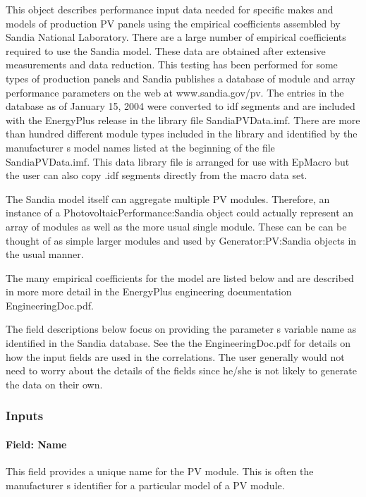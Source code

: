 This object describes performance input data needed for specific makes and models of production PV panels using the empirical coefficients assembled by Sandia National Laboratory. There are a large number of empirical coefficients required to use the Sandia model. These data are obtained after extensive measurements and data reduction. This testing has been performed for some types of production panels and Sandia publishes a database of module and array performance parameters on the web at www.sandia.gov/pv. The entries in the database as of January 15, 2004 were converted to idf segments and are included with the EnergyPlus release in the library file SandiaPVData.imf. There are more than hundred different module types included in the library and identified by the manufacturer s model names listed at the beginning of the file SandiaPVData.imf. This data library file is arranged for use with EpMacro but the user can also copy .idf segments directly from the macro data set.

The Sandia model itself can aggregate multiple PV modules. Therefore, an instance of a PhotovoltaicPerformance:Sandia object could actually represent an array of modules as well as the more usual single module. These can be can be thought of as simple larger modules and used by Generator:PV:Sandia objects in the usual manner.

The many empirical coefficients for the model are listed below and are described in more more detail in the EnergyPlus engineering documentation EngineeringDoc.pdf.

The field descriptions below focus on providing the parameter s variable name as identified in the Sandia database. See the the EngineeringDoc.pdf for details on how the input fields are used in the correlations. The user generally would not need to worry about the details of the fields since he/she is not likely to generate the data on their own.

\subsubsection{Inputs}\label{inputs-22}

\paragraph{Field: Name}\label{field-name-26}

This field provides a unique name for the PV module. This is often the manufacturer s identifier for a particular model of a PV module.

